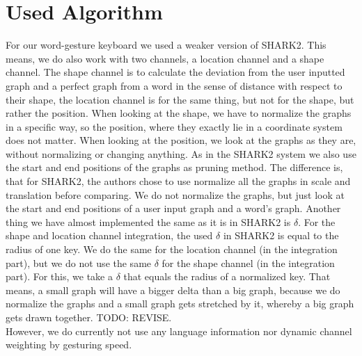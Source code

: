 \section{Used Algorithm}
For our word-gesture keyboard we used a weaker version of SHARK2. This means, we do also work with two channels, a location channel and a shape channel. The shape channel is to calculate the deviation from the user inputted graph and a perfect graph from a word in the sense of distance with respect to their shape, the location channel is for the same thing, but not for the shape, but rather the position. When looking at the shape, we have to normalize the graphs in a specific way, so the position, where they exactly lie in a coordinate system does not matter. When looking at the position, we look at the graphs as they are, without normalizing or changing anything. As in the SHARK2 system we also use the start and end positions of the graphs as pruning method. The difference is, that for SHARK2, the authors chose to use normalize all the graphs in scale and translation before comparing. We do not normalize the graphs, but just look at the start and end positions of a user input graph and a word's graph. Another thing we have almost implemented the same as it is in SHARK2 is $\delta$. For the shape and location channel integration, the used $\delta$ in SHARK2 is equal to the radius of one key. We do the same for the location channel (in the integration part), but we do not use the same $\delta$ for the shape channel (in the integration part). For this, we take a $\delta$ that equals the radius of a normalized key. That means, a small graph will have a bigger delta than a big graph, because we do normalize the graphs and a small graph gets stretched by it, whereby a big graph gets drawn together. TODO: REVISE.\\
However, we do currently not use any language information nor dynamic channel weighting by gesturing speed.

